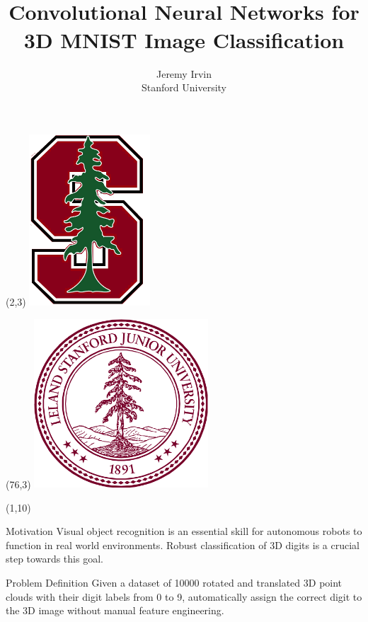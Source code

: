 \documentclass[final]{beamer}
\title{\huge \vspace{0.2em}\\
Convolutional Neural Networks for 3D MNIST Image Classification\vspace{0.2em}}
\author{\huge Jeremy Irvin \\\vspace{0.4em}
\LARGE Stanford University\vspace{0.4em}
}
\date{}
\begin{document}
\begin{frame}{} 

\begin{textblock}{10}(2,3)
\includegraphics[width=4.5cm]{stanford.png}
\end{textblock}

\begin{textblock}{10}(76,3)
\includegraphics[width=6.5cm]{stanford2.png}
\end{textblock}

\begin{textblock}{24}(1,10)
\begin{block}{Motivation}
Visual object recognition is an essential skill for autonomous robots to function in real world environments. Robust classification of 3D digits is a crucial step towards this goal.
\end{block}


\begin{block}{Problem Definition}
Given a dataset of 10000 rotated and translated 3D point clouds with their digit labels from 0 to 9, automatically assign the correct digit to the 3D image without manual feature engineering.
\end{block}


\end{textblock}
\end{frame}
\end{document}
